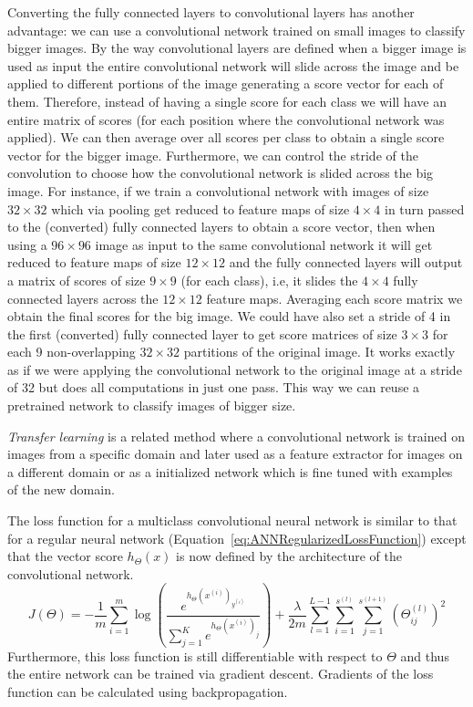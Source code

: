 Converting the fully connected layers to convolutional layers has another advantage: we can use a convolutional network trained on small images to classify bigger images. By the way convolutional layers are defined when a bigger image is used as input the entire convolutional network will slide across the image and be applied to different portions of the image generating a score vector for each of them. Therefore, instead of having a single score for each class we will have an entire matrix of scores (for each position where the convolutional network was applied). We can then average over all scores per class to obtain a single score vector for the bigger image. Furthermore, we can control the stride of the convolution to choose how the convolutional network is slided across the big image.
For instance, if we train a convolutional network with images of size $32\times 32$ which via pooling get reduced to feature maps of size $4\times 4$ in turn passed to the (converted) fully connected layers to obtain a score vector, then when using a $96\times 96$ image as input to the same convolutional network it will get reduced to feature maps of size $12 \times 12$ and the fully connected layers will output a matrix of scores of size $9\times 9$ (for each class), i.e, it slides the $4\times 4$ fully connected layers across the $12\times 12$ feature maps. Averaging each score matrix we obtain the final scores for the big image. We could have also  set a stride of 4 in the first (converted) fully connected layer to get score matrices of size $3\times 3$ for each 9 non-overlapping $32\times 32$ partitions of the original image. It works exactly as if we were applying the convolutional network to the original image at a stride of 32 but does all computations in just one pass. This way we can reuse a pretrained network to classify images of bigger size. 

\emph{Transfer learning} is a related method where a convolutional network is trained on images from a specific domain and later used as a feature extractor for images on a different domain or as a initialized network which is fine tuned with examples of the new domain.

The loss function for a multiclass convolutional neural network is similar to that for a regular neural network (Equation~\ref{eq:ANNRegularizedLossFunction}) except that the vector score $h_\Theta(x)$ is now defined by the architecture of the convolutional network.
\begin{equation}
	J(\Theta) = -\frac{1}{m} \sum_{i=1}^m \log \left ( \frac{ e^{h_\Theta(x^{(i)})_{y^{(i)}}} }{ \sum_{j=1}^K e^{ h_\Theta (x^{(i)})_j} } \right ) + \frac{\lambda}{2m}\sum_{l=1}^{L-1}\sum_{i=1}^{s^{(l)}}\sum_{j=1}^{s^{(l+1)}} \left(\Theta^{(l)}_{ij}\right)^2
	\label{eq:ConvNetLossFunction}
\end{equation}
Furthermore, this loss function is still differentiable with respect to $\Theta$ and thus the entire network can be trained via gradient descent. Gradients of the loss function can be calculated using backpropagation.
